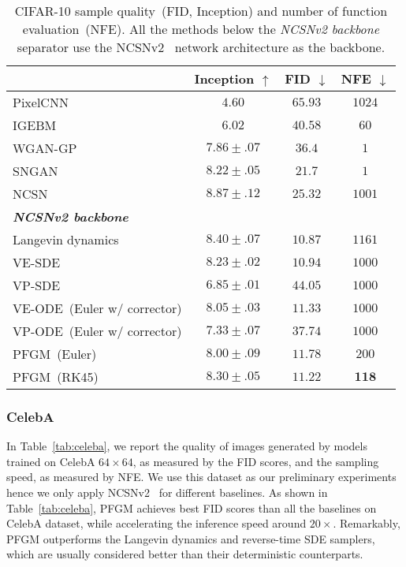 \begin{table}[htbp]
\small
    \centering
    \caption{CIFAR-10 sample quality~(FID, Inception) and number of function evaluation~(NFE). All the methods below the \textit{NCSNv2 backbone} separator use the NCSNv2~\citep{Song2020ImprovedTF} network architecture as the backbone.}
    \begin{tabular}{l c c c}
    \toprule
         & Inception $\uparrow$  &FID $\downarrow$ & NFE $\downarrow$\\
         \midrule
         PixelCNN~\citep{Oord2016ConditionalIG} & $4.60$ & $65.93$ & $1024$\\
        IGEBM~\citep{Du2019ImplicitGA} & $6.02$ & $40.58$ & $60$\\
        WGAN-GP~\citep{Gulrajani2017ImprovedTO} & $7.86 \pm .07$ & $36.4$& $1$\\
        SNGAN~\citep{Miyato2018SpectralNF} & $8.22\pm .05$ & $21.7$ & $1$\\
        NCSN~\citep{Song2019GenerativeMB} & $\bm{8.87 \pm .12}$ & $25.32$ & $1001$\\
        \midrule
        \textit{\textbf{NCSNv2 backbone}}\\
        \midrule
        Langevin dynamics~\citep{Song2020ImprovedTF} & $8.40 \pm .07$ & $\bm{10.87}$ & $1161$\\
        VE-SDE~\citep{Song2021ScoreBasedGM} & $8.23 \pm .02$& $10.94$&$1000$\\
        VP-SDE~\citep{Song2021ScoreBasedGM} & $6.85 \pm .01$& $44.05$&$1000$\\
        \midrule
VE-ODE~(Euler w/ corrector) & $8.05 \pm .03$ &  $11.33$ &  $1000$\\
        VP-ODE~(Euler w/ corrector) & $7.33\pm .07$ &  $37.74$ & $1000$ \\
PFGM~(Euler)& $8.00\pm .09$  &  $11.78$ & $200$ \\
PFGM~(RK45)& $8.30 \pm .05 $ &  $11.22$ & $\bm{118}$ \\
         \bottomrule
    \end{tabular}
    \label{tab:cifar-ncsnv2}
\end{table}


\subsubsection{CelebA}

In Table~\ref{tab:celeba}, we report the quality of images generated by models trained on CelebA $64 \times 64$, as measured by the FID scores, and the sampling speed, as measured
by NFE. We use this dataset as our preliminary experiments hence we only apply NCSNv2~\cite{Song2020ImprovedTF} for different baselines. As shown in Table~\ref{tab:celeba}, PFGM achieves best FID scores than all the baselines on CelebA dataset, while accelerating the inference speed around $20\times$. Remarkably, PFGM outperforms the Langevin dynamics and reverse-time SDE samplers, which are usually considered better than their deterministic counterparts. 


